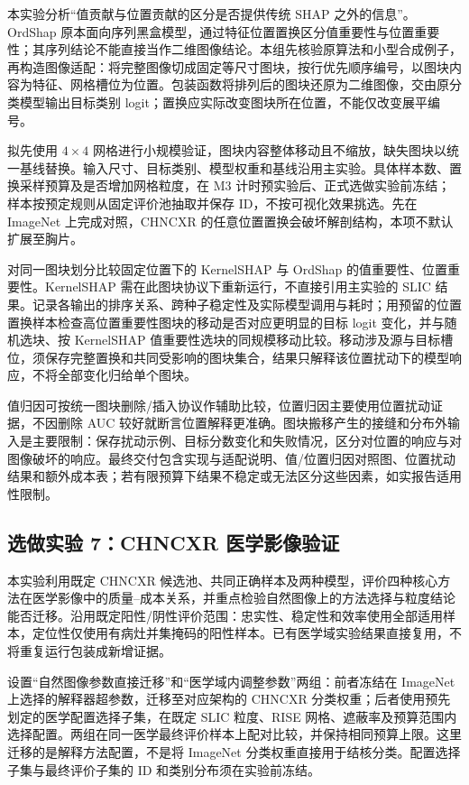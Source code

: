 本实验分析“值贡献与位置贡献的区分是否提供传统 SHAP 之外的信息”。OrdShap 原本面向序列黑盒模型，通过特征位置置换区分值重要性与位置重要性\cite{hill2025ordshap}；其序列结论不能直接当作二维图像结论。本组先核验原算法和小型合成例子，再构造图像适配：将完整图像切成固定等尺寸图块，按行优先顺序编号，以图块内容为特征、网格槽位为位置。包装函数将排列后的图块还原为二维图像，交由原分类模型输出目标类别 logit；置换应实际改变图块所在位置，不能仅改变展平编号。

拟先使用 $4\times4$ 网格进行小规模验证，图块内容整体移动且不缩放，缺失图块以统一基线替换。输入尺寸、目标类别、模型权重和基线沿用主实验。具体样本数、置换采样预算及是否增加网格粒度，在 M3 计时预实验后、正式选做实验前冻结；样本按预定规则从固定评价池抽取并保存 ID，不按可视化效果挑选。先在 ImageNet 上完成对照，CHNCXR 的任意位置置换会破坏解剖结构，本项不默认扩展至胸片。

对同一图块划分比较固定位置下的 KernelSHAP 与 OrdShap 的值重要性、位置重要性。KernelSHAP 需在此图块协议下重新运行，不直接引用主实验的 SLIC 结果。记录各输出的排序关系、跨种子稳定性及实际模型调用与耗时；用预留的位置置换样本检查高位置重要性图块的移动是否对应更明显的目标 logit 变化，并与随机选块、按 KernelSHAP 值重要性选块的同规模移动比较。移动涉及源与目标槽位，须保存完整置换和共同受影响的图块集合，结果只解释该位置扰动下的模型响应，不将全部变化归给单个图块。

值归因可按统一图块删除/插入协议作辅助比较，位置归因主要使用位置扰动证据，不因删除 AUC 较好就断言位置解释更准确。图块搬移产生的接缝和分布外输入是主要限制：保存扰动示例、目标分数变化和失败情况，区分对位置的响应与对图像破坏的响应。最终交付包含实现与适配说明、值/位置归因对照图、位置扰动结果和额外成本表；若有限预算下结果不稳定或无法区分这些因素，如实报告适用性限制。

\subsection{选做实验 7：CHNCXR 医学影像验证}

本实验利用既定 CHNCXR 候选池、共同正确样本及两种模型，评价四种核心方法在医学影像中的质量--成本关系，并重点检验自然图像上的方法选择与粒度结论能否迁移。沿用既定阳性/阴性评价范围：忠实性、稳定性和效率使用全部适用样本，定位性仅使用有病灶并集掩码的阳性样本。已有医学域实验结果直接复用，不将重复运行包装成新增证据。

设置“自然图像参数直接迁移”和“医学域内调整参数”两组：前者冻结在 ImageNet 上选择的解释器超参数，迁移至对应架构的 CHNCXR 分类权重；后者使用预先划定的医学配置选择子集，在既定 SLIC 粒度、RISE 网格、遮蔽率及预算范围内选择配置。两组在同一医学最终评价样本上配对比较，并保持相同预算上限。这里迁移的是解释方法配置，不是将 ImageNet 分类权重直接用于结核分类。配置选择子集与最终评价子集的 ID 和类别分布须在实验前冻结。


